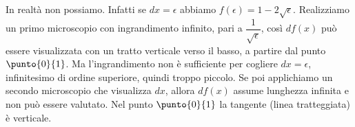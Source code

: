 \begin{esempio}
\begin{inaccessibleblock}
 \begin{center}
 \begin{minipage}[]{.45 \textwidth}
  \derivaradiceinzero
 \end{minipage} 
 \hfill
 \begin{minipage}[]{.50 \textwidth}
\vspace{-2em}
In realtà non possiamo. Infatti se $dx=\epsilon$ abbiamo 
$f(\epsilon)=1-2\sqrt{\epsilon}$.
Realizziamo un primo microscopio con ingrandimento infinito, pari a 
$\dfrac{1}{\sqrt{\epsilon}}$, così $df(x)$ può essere visualizzata con un 
tratto verticale verso il basso, a partire dal punto $\punto{0}{1}$. Ma 
l'ingrandimento non è sufficiente per cogliere $dx=\epsilon$,  
infinitesimo di ordine superiore, quindi troppo piccolo.
Se poi applichiamo un secondo microscopio che visualizza $dx$, allora $df(x)$
assume lunghezza infinita e non può essere valutato. Nel punto $\punto{0}{1}$
la tangente (linea tratteggiata) è verticale.
\end{minipage}
\end{center}
\end{inaccessibleblock}
\label{}
\end{esempio}

